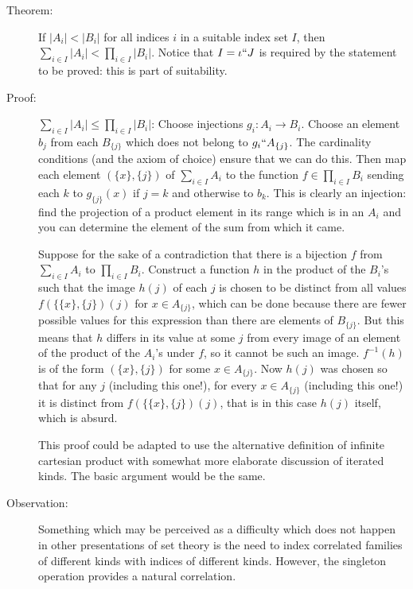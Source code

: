 \documentclass[12pt]{article}
\begin{document}
\begin{description}
\item[Theorem:]  If $|A_i| < |B_i|$ for all indices $i$ in a suitable index set $I$, then $\sum_{i\in I}|A_i| < \prod_{i \in I}|B_i|$.  Notice that $I = \iota``J$ is required by the statement to be proved:  this is part of suitability.

\item[Proof:]  $\sum_{i\in I}|A_i| \leq \prod_{i \in I}|B_i|$:  Choose injections $g_i:A_i \rightarrow B_i$.  Choose an element $b_j$ from each $B_{\{j\}}$ which does not belong to $g_i``A_{\{j\}}$.  The cardinality conditions (and the axiom of choice) ensure that we can do this.  Then map each element $(\{x\},\{j\})$ of $\sum_{i\in I}A_i$ to the function $f \in \prod_{i\in I}B_i$ sending each $k$ to $g_{\{j\}}(x)$ if $j=k$ and otherwise to $b_k$.  This is clearly an injection:  find the projection of a product element in its range which is in an $A_i$ and you can determine the element of the sum from which it came.

Suppose for the sake of a contradiction that there is a bijection $f$ from $\sum_{i\in I}A_i$ to $\prod_{i \in I}B_i$.  Construct a function $h$ in the product of the $B_i$'s such that  the image $h(j)$ of each $j$ is chosen to be distinct from all values $f(\{\{x\},\{j\})(j)$ for $x \in A_{\{j\}}$, which can be done because there are
fewer possible values for this expression than there are elements of $B_{\{j\}}$.  But this means that $h$ differs in its value at some $j$ from every image of an element of the product of the $A_i$'s under $f$, so it cannot be such an image.  $f^{-1}(h)$  is of the form $(\{x\},\{j\})$ for some $x \in A_{\{j\}}$.  Now $h(j)$ was chosen so that for any  $j$ (including this one!), for every $x \in A_{\{j\}}$ (including this one!) it is distinct from  $f(\{\{x\},\{j\})(j)$, that is in this case $h(j)$ itself, which is absurd.

This proof could be adapted to use the alternative definition of infinite cartesian product with somewhat more elaborate discussion of iterated kinds.  The basic argument would be the same.

\item[Observation:]  Something which may be perceived as a difficulty which does not happen in other presentations of set theory is the need to index correlated families of different kinds with indices of different kinds.  However, the singleton operation provides a natural correlation.

\end{description}
\end{document}
